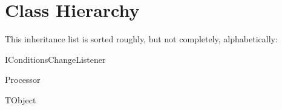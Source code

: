 \section{Class Hierarchy}
This inheritance list is sorted roughly, but not completely, alphabetically\-:\begin{DoxyCompactList}
\item I\-Conditions\-Change\-Listener\begin{DoxyCompactList}
\item {}
\end{DoxyCompactList}
\item Processor\begin{DoxyCompactList}
\item {}
\end{DoxyCompactList}
\item T\-Object\begin{DoxyCompactList}
\item {}
\end{DoxyCompactList}
\end{DoxyCompactList}
